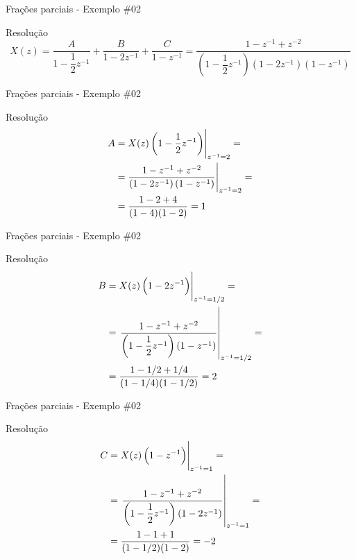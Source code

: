 \begin{frame}{Frações parciais - Exemplo \#02}
	\begin{block}{Resolução}
		\[ X(z)=\dfrac{A}{1-\dfrac{1}{2}z^{-1}}+\dfrac{B}{1-2z^{-1}}+\dfrac{C}{1-z^{-1}}= \dfrac{1-z^{-1}+z^{-2}}{\left( 1-\dfrac{1}{2}z^{-1} \right) \left( 1-2z^{-1} \right) \left( 1-z^{-1} \right) } \]
	\end{block}
\end{frame}


\begin{frame}{Frações parciais - Exemplo \#02}
\begin{block}{Resolução}
	\begin{align*}
	A&=\eval{X(z)\left(1-\dfrac{1}{2}z^{-1}\right)}_{z^{-1}=2}=\\
	&=\eval{\dfrac{1-z^{-1}+z^{-2}}{\left(1-2z^{-1}\right)\left(1-z^{-1}\right)}}_{z^{-1}=2}=\\
	&=\dfrac{1-2+4}{(1-4)(1-2)}=1
	\end{align*}
\end{block}
\end{frame}

\begin{frame}{Frações parciais - Exemplo \#02}
\begin{block}{Resolução}
	\begin{align*}
	B&=\eval{X(z)\left(1-2z^{-1}\right)}_{z^{-1}=1/2}=\\
	&=\left. \dfrac{1-z^{-1}+z^{-2}}{\left(1-\dfrac{1}{2}z^{-1}\right)\left(1-z^{-1} \right)}\right| _{z^{-1}=1/2}=\\
	&=\dfrac{1-1/2+1/4}{(1-1/4)(1-1/2)}=2
	\end{align*}
\end{block}
\end{frame}

\begin{frame}{Frações parciais - Exemplo \#02}
\begin{block}{Resolução}
	\begin{align*}
	C&=\eval{X(z)\left(1-z^{-1}\right)}_{z^{-1}=1}=\\
	&=\left. \dfrac{1-z^{-1}+z^{-2}}{\left(1-\dfrac{1}{2}z^{-1}\right)\left(1-2z^{-1} \right)}\right| _{z^{-1}=1}=\\
	&=\dfrac{1-1+1}{(1-1/2)(1-2)}=-2
	\end{align*}
\end{block}
\end{frame}

